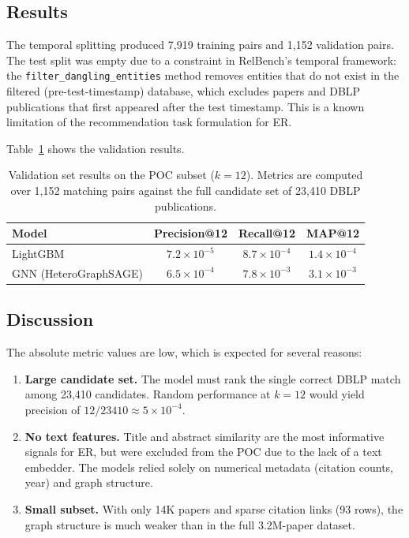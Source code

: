\documentclass{article}
\begin{document}
\subsection{Results}

The temporal splitting produced 7,919 training pairs and 1,152 validation pairs.
The test split was empty due to a constraint in RelBench's temporal framework: the \texttt{filter\_dangling\_entities} method removes entities that do not exist in the filtered (pre-test-timestamp) database, which excludes papers and DBLP publications that first appeared after the test timestamp.
This is a known limitation of the recommendation task formulation for ER.

Table~\ref{tab:results} shows the validation results.

\begin{table}[h!]
\centering
\caption{Validation set results on the POC subset ($k=12$). Metrics are computed over 1,152 matching pairs against the full candidate set of 23,410 DBLP publications.}
\label{tab:results}
\begin{tabular}{lccc}
\toprule
\textbf{Model} & \textbf{Precision@12} & \textbf{Recall@12} & \textbf{MAP@12} \\
\midrule
LightGBM & $7.2 \times 10^{-5}$ & $8.7 \times 10^{-4}$ & $1.4 \times 10^{-4}$ \\
GNN (HeteroGraphSAGE) & $6.5 \times 10^{-4}$ & $7.8 \times 10^{-3}$ & $3.1 \times 10^{-3}$ \\
\bottomrule
\end{tabular}
\end{table}

\subsection{Discussion}

The absolute metric values are low, which is expected for several reasons:

\begin{enumerate}
    \item \textbf{Large candidate set.} The model must rank the single correct DBLP match among 23,410 candidates. Random performance at $k=12$ would yield precision of $12/23410 \approx 5 \times 10^{-4}$.
    \item \textbf{No text features.} Title and abstract similarity are the most informative signals for ER, but were excluded from the POC due to the lack of a text embedder. The models relied solely on numerical metadata (citation counts, year) and graph structure.
    \item \textbf{Small subset.} With only 14K papers and sparse citation links (93 rows), the graph structure is much weaker than in the full 3.2M-paper dataset.
\end{enumerate}
\end{document}
